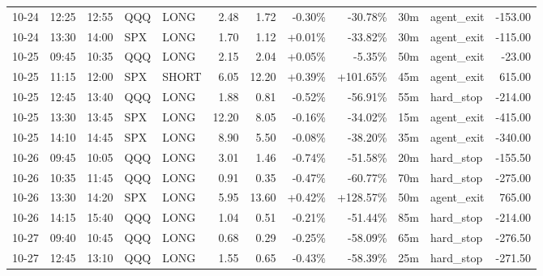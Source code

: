 \documentclass[11pt,a4paper,twoside]{article}
\begin{document}
\begin{center}
\begin{longtable}{>{\color{txtmain}}l l l l l r r r r r >{\color{txtmain}}l r}
10-24 & 12:25 & 12:55 & QQQ & LONG & 2.48 & 1.72 & \textcolor{lossred}{-0.30\%} & \textcolor{lossred}{-30.78\%} & 30m & agent\_exit & \textcolor{lossred}{-153.00} \\
10-24 & 13:30 & 14:00 & SPX & LONG & 1.70 & 1.12 & \textcolor{wingreen}{+0.01\%} & \textcolor{lossred}{-33.82\%} & 30m & agent\_exit & \textcolor{lossred}{-115.00} \\
10-25 & 09:45 & 10:35 & QQQ & LONG & 2.15 & 2.04 & \textcolor{wingreen}{+0.05\%} & \textcolor{lossred}{-5.35\%} & 50m & agent\_exit & \textcolor{lossred}{-23.00} \\
10-25 & 11:15 & 12:00 & SPX & SHORT & 6.05 & 12.20 & \textcolor{wingreen}{+0.39\%} & \textcolor{wingreen}{+101.65\%} & 45m & agent\_exit & \textcolor{wingreen}{615.00} \\
10-25 & 12:45 & 13:40 & QQQ & LONG & 1.88 & 0.81 & \textcolor{lossred}{-0.52\%} & \textcolor{lossred}{-56.91\%} & 55m & hard\_stop & \textcolor{lossred}{-214.00} \\
10-25 & 13:30 & 13:45 & SPX & LONG & 12.20 & 8.05 & \textcolor{lossred}{-0.16\%} & \textcolor{lossred}{-34.02\%} & 15m & agent\_exit & \textcolor{lossred}{-415.00} \\
10-25 & 14:10 & 14:45 & SPX & LONG & 8.90 & 5.50 & \textcolor{lossred}{-0.08\%} & \textcolor{lossred}{-38.20\%} & 35m & agent\_exit & \textcolor{lossred}{-340.00} \\
10-26 & 09:45 & 10:05 & QQQ & LONG & 3.01 & 1.46 & \textcolor{lossred}{-0.74\%} & \textcolor{lossred}{-51.58\%} & 20m & hard\_stop & \textcolor{lossred}{-155.50} \\
10-26 & 10:35 & 11:45 & QQQ & LONG & 0.91 & 0.35 & \textcolor{lossred}{-0.47\%} & \textcolor{lossred}{-60.77\%} & 70m & hard\_stop & \textcolor{lossred}{-275.00} \\
10-26 & 13:30 & 14:20 & SPX & LONG & 5.95 & 13.60 & \textcolor{wingreen}{+0.42\%} & \textcolor{wingreen}{+128.57\%} & 50m & agent\_exit & \textcolor{wingreen}{765.00} \\
10-26 & 14:15 & 15:40 & QQQ & LONG & 1.04 & 0.51 & \textcolor{lossred}{-0.21\%} & \textcolor{lossred}{-51.44\%} & 85m & hard\_stop & \textcolor{lossred}{-214.00} \\
10-27 & 09:40 & 10:45 & QQQ & LONG & 0.68 & 0.29 & \textcolor{lossred}{-0.25\%} & \textcolor{lossred}{-58.09\%} & 65m & hard\_stop & \textcolor{lossred}{-276.50} \\
10-27 & 12:45 & 13:10 & QQQ & LONG & 1.55 & 0.65 & \textcolor{lossred}{-0.43\%} & \textcolor{lossred}{-58.39\%} & 25m & hard\_stop & \textcolor{lossred}{-271.50} \\

\end{longtable}
\end{center}
\end{document}
